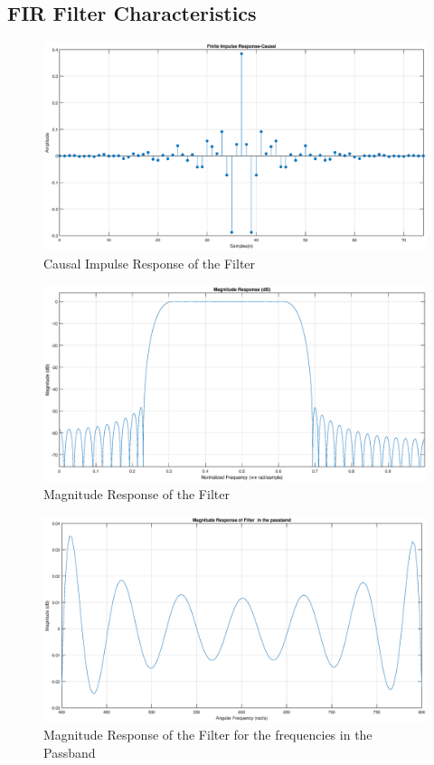 \documentclass[a4paper,11pt]{article}%
\begin{document}
\subsection{FIR Filter Characteristics}
\begin{figure}[!h]
	\centering
	\includegraphics[scale=0.4]{figures/causal-impulse-response}
	\caption{Causal Impulse Response of the Filter}
\end{figure}


\begin{figure}[!h]
	\centering
	\includegraphics[scale=0.4]{figures/magnitude-response}
	\caption{Magnitude Response of the Filter}
\end{figure}

\begin{figure}[!h]
	\centering
	\includegraphics[scale=0.4]{figures/magnitude-resp-passband}
	\caption{Magnitude Response of the Filter for the frequencies in the Passband}
\end{figure}
\end{document}
